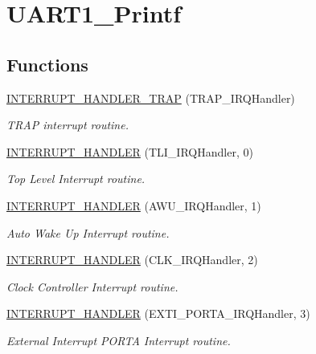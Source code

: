 \hypertarget{group___u_a_r_t1___printf}{}\section{U\+A\+R\+T1\+\_\+\+Printf}
\label{group___u_a_r_t1___printf}
\subsection*{Functions}
\begin{DoxyCompactItemize}
\item 
\hyperlink{group___u_a_r_t1___printf_ga305d9fb47fba01edc55f7055438e2020}{I\+N\+T\+E\+R\+R\+U\+P\+T\+\_\+\+H\+A\+N\+D\+L\+E\+R\+\_\+\+T\+R\+AP} (T\+R\+A\+P\+\_\+\+I\+R\+Q\+Handler)
\begin{DoxyCompactList}\small\item\em T\+R\+AP interrupt routine. \end{DoxyCompactList}\item 
\hyperlink{group___u_a_r_t1___printf_ga0631a80ec70e3fbf9dc4ea2a043acde3}{I\+N\+T\+E\+R\+R\+U\+P\+T\+\_\+\+H\+A\+N\+D\+L\+ER} (T\+L\+I\+\_\+\+I\+R\+Q\+Handler, 0)
\begin{DoxyCompactList}\small\item\em Top Level Interrupt routine. \end{DoxyCompactList}\item 
\hyperlink{group___u_a_r_t1___printf_gab86f6421d31437b56c5d0d2924e334db}{I\+N\+T\+E\+R\+R\+U\+P\+T\+\_\+\+H\+A\+N\+D\+L\+ER} (A\+W\+U\+\_\+\+I\+R\+Q\+Handler, 1)
\begin{DoxyCompactList}\small\item\em Auto Wake Up Interrupt routine. \end{DoxyCompactList}\item 
\hyperlink{group___u_a_r_t1___printf_ga8b447af5c4868260f054f611c31c32b8}{I\+N\+T\+E\+R\+R\+U\+P\+T\+\_\+\+H\+A\+N\+D\+L\+ER} (C\+L\+K\+\_\+\+I\+R\+Q\+Handler, 2)
\begin{DoxyCompactList}\small\item\em Clock Controller Interrupt routine. \end{DoxyCompactList}\item 
\hyperlink{group___u_a_r_t1___printf_ga63045c73586bc1dd4a633f0cabd75886}{I\+N\+T\+E\+R\+R\+U\+P\+T\+\_\+\+H\+A\+N\+D\+L\+ER} (E\+X\+T\+I\+\_\+\+P\+O\+R\+T\+A\+\_\+\+I\+R\+Q\+Handler, 3)
\begin{DoxyCompactList}\small\item\em External Interrupt P\+O\+R\+TA Interrupt routine. \end{DoxyCompactList}\item 

\end{DoxyCompactItemize}
